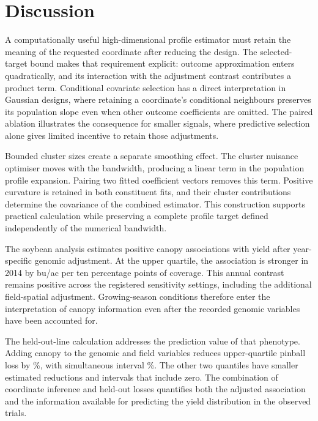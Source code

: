 \section{Discussion}\label{sec:discussion}

A computationally useful high-dimensional profile estimator must
retain the meaning of the requested coordinate after reducing the
design. The selected-target bound makes that requirement explicit:
outcome approximation enters quadratically, and its interaction with
the adjustment contrast contributes a product term. Conditional
covariate selection has a direct interpretation in Gaussian designs,
where retaining a coordinate's conditional neighbours preserves its
population slope even when other outcome coefficients are omitted.
The paired ablation illustrates the consequence for smaller signals,
where predictive selection alone gives limited incentive to retain
those adjustments.

Bounded cluster sizes create a separate smoothing effect. The cluster
nuisance optimiser moves with the bandwidth, producing a linear term
in the population profile expansion. Pairing two fitted coefficient
vectors removes this term. Positive curvature is retained in both
constituent fits, and their cluster contributions determine the
covariance of the combined estimator. This construction supports
practical calculation while preserving a complete profile target
defined independently of the numerical bandwidth.

The soybean analysis estimates positive canopy associations with yield
after year-specific genomic adjustment. At the upper quartile, the
association is stronger in 2014 by \SoyUpperYearDifference{} bu/ac
per ten percentage points of coverage. This annual contrast remains
positive across the registered sensitivity settings, including the
additional field-spatial adjustment. Growing-season conditions therefore
enter the interpretation of canopy information even after the recorded
genomic variables have been accounted for.

The held-out-line calculation addresses the prediction value of that
phenotype. Adding canopy to the genomic and field variables reduces
upper-quartile pinball loss by \SoyGenomicUpperGain{}\%, with
simultaneous interval \SoyGenomicUpperGainInterval{}\%. The other
two quantiles have smaller estimated reductions and intervals that
include zero. The combination of coordinate inference and held-out
losses quantifies both the adjusted association and the information
available for predicting the yield distribution in the observed trials.


